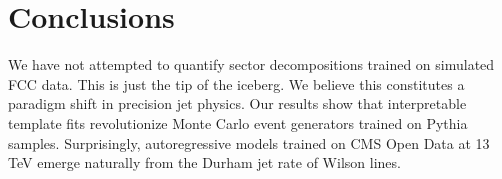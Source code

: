 \section{Conclusions}\label{sec:conclusions}

We have not attempted to quantify sector decompositions trained on
simulated FCC data. This is just the tip of the iceberg. We believe this
constitutes a paradigm shift in precision jet physics. Our results show
that interpretable template fits revolutionize Monte Carlo event
generators trained on Pythia samples. Surprisingly, autoregressive
models trained on CMS Open Data at 13 TeV emerge naturally from the
Durham jet rate of Wilson lines.

